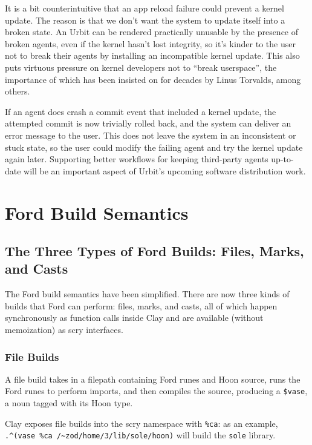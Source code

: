 \documentclass[twoside]{article}
\begin{document}
It is a bit counterintuitive that an app reload failure could prevent a kernel update. The reason is that we don't want the system to update itself into a broken state. An Urbit can be rendered practically unusable by the presence of broken agents, even if the kernel hasn't lost integrity, so it's kinder to the user not to break their agents by installing an incompatible kernel update. This also puts virtuous pressure on kernel developers not to ``break userspace'', the importance of which has been insisted on for decades by Linus Torvalds, among others.

If an agent does crash a commit event that included a kernel update, the attempted commit is now trivially rolled back, and the system can deliver an error message to the user. This does not leave the system in an inconsistent or stuck state, so the user could modify the failing agent and try the kernel update again later. Supporting better workflows for keeping third-party agents up-to-date will be an important aspect of Urbit’s upcoming software distribution work.


\section{Ford Build Semantics}

\subsection{The Three Types of Ford Builds: Files, Marks, and Casts}

The Ford build semantics have been simplified. There are now three kinds of builds that Ford can perform: files, marks, and casts, all of which happen synchronously as function calls inside Clay and are available (without memoization) as scry interfaces.

\subsubsection{File Builds}

A file build takes in a filepath containing Ford runes and Hoon source, runs the Ford runes to perform imports, and then compiles the source, producing a \lstinline[style=inlinecode]{$vase}, a noun tagged with its Hoon type.

Clay exposes file builds into the scry namespace with \lstinline[style=inlinecode]{%ca}: as an example, \lstinline[style=inlinecode]{.^(vase %ca /~zod/home/3/lib/sole/hoon)} will build the \lstinline[style=inlinecode]{sole} library.
\end{document}
